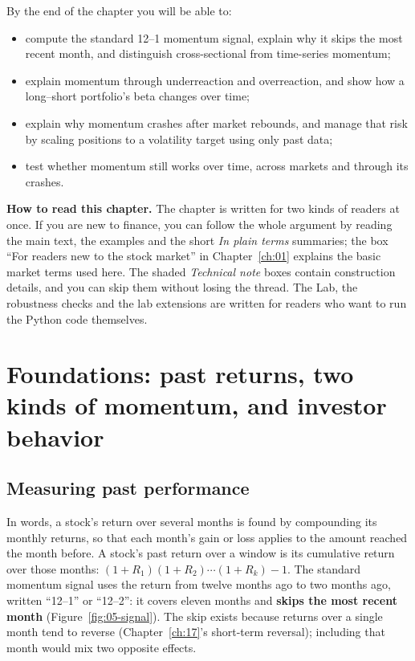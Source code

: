 By the end of the chapter you will be able to:

\begin{itemize}
  \item compute the standard 12--1 momentum signal, explain why it skips the most recent month, and distinguish cross-sectional from time-series momentum;
  \item explain momentum through underreaction and overreaction, and show how a long--short portfolio's beta changes over time;
  \item explain why momentum crashes after market rebounds, and manage that risk by scaling positions to a volatility target using only past data;
  \item test whether momentum still works over time, across markets and through its crashes.
\end{itemize}

\begin{callout}
\textbf{How to read this chapter.} The chapter is written for two kinds of readers at once. If you are new to finance, you can follow the whole argument by reading the main text, the examples and the short \emph{In plain terms} summaries; the box ``For readers new to the stock market'' in Chapter~\ref{ch:01} explains the basic market terms used here. The shaded \emph{Technical note} boxes contain construction details, and you can skip them without losing the thread. The Lab, the robustness checks and the lab extensions are written for readers who want to run the Python code themselves.
\end{callout}


\section{Foundations: past returns, two kinds of momentum, and investor behavior}
\label{sec:05-foundations}

\subsection{Measuring past performance}

In words, a stock's return over several months is found by compounding its monthly returns, so that each month's gain or loss applies to the amount reached the month before. A stock's past return over a window is its cumulative return over those months: $(1 + R_1)(1 + R_2)\cdots(1 + R_k) - 1$. The standard momentum signal uses the return from twelve months ago to two months ago, written ``12--1'' or ``12--2'': it covers eleven months and \textbf{skips the most recent month} (Figure~\ref{fig:05-signal}). The skip exists because returns over a single month tend to reverse (Chapter~\ref{ch:17}'s short-term reversal); including that month would mix two opposite effects.

